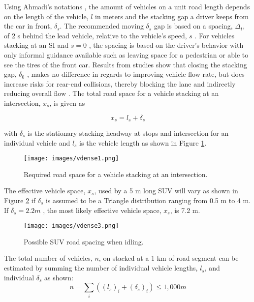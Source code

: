 Using Ahmadi's notations \citep{Ahmadi2017}, the amount of vehicles on a unit road length depends on the length of the vehicle, $l$ in meters and the stacking gap a driver keeps from the car in front, $\delta_{s}$.  The recommended moving $\delta_{s}$ gap is based on a spacing, $\Delta_{t}$, of 2 s behind the lead vehicle, relative to the vehicle's speed, $s$ \citep{NYDMV2015, ukdot2017}.  For vehicles stacking at an SI and $s=0$ , the spacing is based on the driver's behavior with only informal guidance available such as leaving space for a pedestrian or able to see the tires of the front car. Results from studies show that closing the stacking gap, $\delta_{0}$ , makes no difference in regards to improving vehicle flow rate, but does increase risks for rear-end collisions, thereby blocking the lane and indirectly reducing overall flow \citep{Ahmadi2017}. The total road space for a vehicle stacking at an intersection, $x_{s}$, is given as

\begin{equation}
\label{eq:roadspace}
x_{s}= l_{s} +\delta_{s}
\end{equation}

\noindent
with $\delta_{s}$ is the stationary stacking headway at stops and intersection for an individual vehicle and $l_{s}$ is the vehicle length as shown in Figure \ref{fig1:roadspace}.

\begin{figure}[H]
\texttt{[image: images/vdense1.png]} 
\caption{Required road space for a vehicle stacking at an intersection.}
\label{fig1:roadspace}
\end{figure}
%
 The effective vehicle space, $x_{s}$, used by a 5 m long SUV will vary as shown in Figure \ref{fig3:SUVspace} if $\delta_{s}$ is assumed to be a Triangle distribution ranging from 0.5 m to 4 m.  If $\delta_{s} = 2.2 m$ , the most likely effective vehicle space, $x_{s}$,  is  7.2 m.
%
\begin{figure}[H]
\texttt{[image: images/vdense3.png]} 
\caption{Possible SUV road spacing when idling.}
\label{fig3:SUVspace}
\end{figure}
%

The total number of vehicles, $n$, on stacked at a 1 km of road segment can be estimated by summing the number of individual vehicle lengths, $l_{s}$, and individual $\delta_{s}$ as shown:
% 
\begin{equation}
\label{eq1:roadspace}
n = \sum_{i}\left ({(l_{s})_{i} +(\delta_{s})_{i}} \right )\leq 1,000 m 
\end{equation}
%


